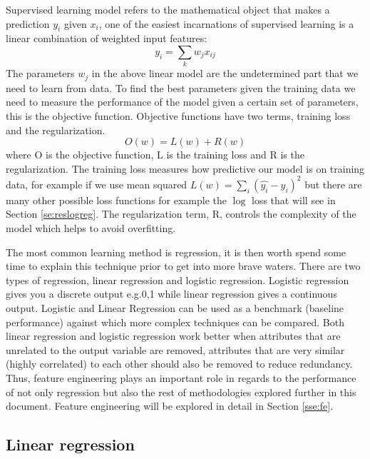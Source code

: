 \documentclass[11pt]{article}
\theoremstyle{definition}
\theoremstyle{remark}
\begin{document}
Supervised learning model refers to the mathematical object that makes a prediction $y_i$ given $x_i$, one of the easiest incarnations of supervised learning is a linear combination of weighted input features:
\begin{equation}
y_i = \sum_k w_j x_{ij}
\label{eq:reg1}
\end{equation}
The parameters $w_j$ in the above linear model are the undetermined part that we need to learn from data. To find the best parameters given the training data we need to measure the performance of the model given a certain set of parameters, this is the objective function. Objective functions have two terms, training loss and the regularization.
\begin{equation}
O(w) = L(w) + R(w)
\end{equation}
where O is the objective function, L is the training loss and R is the regularization. The training loss measures how predictive our model is on training data, for example if we use mean squared $L(w) = \sum_i (\hat{y_i} - y_i)^2$ but there are many other possible loss functions for example the $\log$ loss that will see in Section \ref{se:reslogreg}. The regularization term, R, controls the complexity of the model which helps to avoid overfitting.

The most common learning method is regression, it is then worth spend some time to explain this technique prior to get into more brave waters. 
There are two types of regression, linear regression and logistic regression. Logistic regression gives you a discrete output e.g.0,1 while linear regression gives a continuous output. Logistic and Linear Regression can be used as a benchmark (baseline performance) against which more complex techniques can be compared. 
Both linear regression and logistic regression work better when attributes that are unrelated to the output variable are removed, attributes that are very similar (highly correlated) to each other should also be removed to reduce redundancy. Thus, feature engineering plays an important role in regards to the performance of not only regression but also the rest of methodologies explored further in this document. Feature engineering will be explored in detail in Section \ref{sse:fe}.

\subsection{Linear regression}
\label{sse:linreg}
\end{document}
